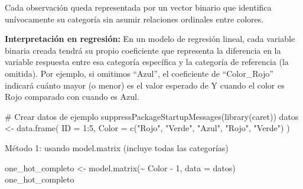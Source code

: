 \documentclass[
  letterpaper,
  DIV=11,
  numbers=noendperiod]{scrreprt}
\newenvironment{Shaded}{\begin{snugshade}}{\end{snugshade}}
\newcommand{\AttributeTok}[1]{\textcolor[rgb]{0.40,0.45,0.13}{#1}}
\newcommand{\CommentTok}[1]{\textcolor[rgb]{0.37,0.37,0.37}{#1}}
\newcommand{\DecValTok}[1]{\textcolor[rgb]{0.68,0.00,0.00}{#1}}
\newcommand{\FunctionTok}[1]{\textcolor[rgb]{0.28,0.35,0.67}{#1}}
\newcommand{\NormalTok}[1]{\textcolor[rgb]{0.00,0.23,0.31}{#1}}
\newcommand{\OtherTok}[1]{\textcolor[rgb]{0.00,0.23,0.31}{#1}}
\newcommand{\SpecialCharTok}[1]{\textcolor[rgb]{0.37,0.37,0.37}{#1}}
\newcommand{\StringTok}[1]{\textcolor[rgb]{0.13,0.47,0.30}{#1}}
\begin{document}
Cada observación queda representada por un vector binario que identifica
unívocamente su categoría sin asumir relaciones ordinales entre colores.

\textbf{Interpretación en regresión:} En un modelo de regresión lineal,
cada variable binaria creada tendrá su propio coeficiente que representa
la diferencia en la variable respuesta entre esa categoría específica y
la categoría de referencia (la omitida). Por ejemplo, si omitimos
``Azul'', el coeficiente de ``Color\_Rojo'' indicará cuánto mayor (o
menor) es el valor esperado de Y cuando el color es Rojo comparado con
cuando es Azul.

\begin{tcolorbox}[enhanced jigsaw, breakable, toprule=.15mm, bottomtitle=1mm, coltitle=black, colbacktitle=quarto-callout-tip-color!10!white, titlerule=0mm, opacitybacktitle=0.6, bottomrule=.15mm, toptitle=1mm, title=\textcolor{quarto-callout-tip-color}{\faLightbulb}\hspace{0.5em}{Implementación práctica}, arc=.35mm, rightrule=.15mm, opacityback=0, colframe=quarto-callout-tip-color-frame, leftrule=.75mm, left=2mm, colback=white]

\begin{Shaded}
\begin{Highlighting}[]
\CommentTok{\# Crear datos de ejemplo}
\FunctionTok{suppressPackageStartupMessages}\NormalTok{(}\FunctionTok{library}\NormalTok{(caret))}
\NormalTok{datos }\OtherTok{\textless{}{-}} \FunctionTok{data.frame}\NormalTok{(}
  \AttributeTok{ID =} \DecValTok{1}\SpecialCharTok{:}\DecValTok{5}\NormalTok{,}
  \AttributeTok{Color =} \FunctionTok{c}\NormalTok{(}\StringTok{"Rojo"}\NormalTok{, }\StringTok{"Verde"}\NormalTok{, }\StringTok{"Azul"}\NormalTok{, }\StringTok{"Rojo"}\NormalTok{, }\StringTok{"Verde"}\NormalTok{)}
\NormalTok{)}
\end{Highlighting}
\end{Shaded}

Método 1: usando model.matrix (incluye todas las categorías)

\begin{Shaded}
\begin{Highlighting}[]
\NormalTok{one\_hot\_completo }\OtherTok{\textless{}{-}} \FunctionTok{model.matrix}\NormalTok{(}\SpecialCharTok{\textasciitilde{}}\NormalTok{ Color }\SpecialCharTok{{-}} \DecValTok{1}\NormalTok{, }\AttributeTok{data =}\NormalTok{ datos)}
\NormalTok{one\_hot\_completo}
\end{Highlighting}
\end{Shaded}


\end{tcolorbox}
\end{document}
